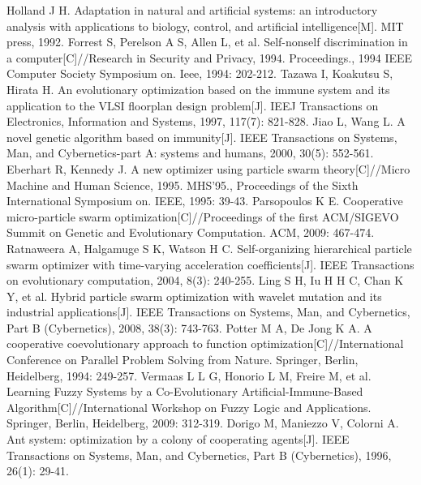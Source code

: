 \documentclass[11pt,a4paper,oldfontcommands]{memoir}
\begin{document}
\appendix
\begin{thebibliography}{}
Holland J H. Adaptation in natural and artificial systems: an introductory analysis with applications to biology, control, and artificial intelligence[M]. MIT press, 1992.
Forrest S, Perelson A S, Allen L, et al. Self-nonself discrimination in a computer[C]//Research in Security and Privacy, 1994. Proceedings., 1994 IEEE Computer Society Symposium on. Ieee, 1994: 202-212.
Tazawa I, Koakutsu S, Hirata H. An evolutionary optimization based on the immune system and its application to the VLSI floorplan design problem[J]. IEEJ Transactions on Electronics, Information and Systems, 1997, 117(7): 821-828.
Jiao L, Wang L. A novel genetic algorithm based on immunity[J]. IEEE Transactions on Systems, Man, and Cybernetics-part A: systems and humans, 2000, 30(5): 552-561.
Eberhart R, Kennedy J. A new optimizer using particle swarm theory[C]//Micro Machine and Human Science, 1995. MHS'95., Proceedings of the Sixth International Symposium on. IEEE, 1995: 39-43.
Parsopoulos K E. Cooperative micro-particle swarm optimization[C]//Proceedings of the first ACM/SIGEVO Summit on Genetic and Evolutionary Computation. ACM, 2009: 467-474.
Ratnaweera A, Halgamuge S K, Watson H C. Self-organizing hierarchical particle swarm optimizer with time-varying acceleration coefficients[J]. IEEE Transactions on evolutionary computation, 2004, 8(3): 240-255.
Ling S H, Iu H H C, Chan K Y, et al. Hybrid particle swarm optimization with wavelet mutation and its industrial applications[J]. IEEE Transactions on Systems, Man, and Cybernetics, Part B (Cybernetics), 2008, 38(3): 743-763.
Potter M A, De Jong K A. A cooperative coevolutionary approach to function optimization[C]//International Conference on Parallel Problem Solving from Nature. Springer, Berlin, Heidelberg, 1994: 249-257.
Vermaas L L G, Honorio L M, Freire M, et al. Learning Fuzzy Systems by a Co-Evolutionary Artificial-Immune-Based Algorithm[C]//International Workshop on Fuzzy Logic and Applications. Springer, Berlin, Heidelberg, 2009: 312-319.
Dorigo M, Maniezzo V, Colorni A. Ant system: optimization by a colony of cooperating agents[J]. IEEE Transactions on Systems, Man, and Cybernetics, Part B (Cybernetics), 1996, 26(1): 29-41.

\end{thebibliography}
\end{document}
